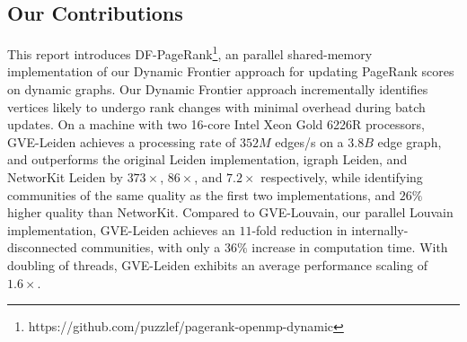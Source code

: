 \subsection{Our Contributions}

This report introduces DF-PageRank\footnote{https://github.com/puzzlef/pagerank-openmp-dynamic}, an parallel shared-memory implementation of our Dynamic Frontier approach for updating PageRank scores on dynamic graphs. Our Dynamic Frontier approach incrementally identifies vertices likely to undergo rank changes with minimal overhead during batch updates. On a machine with two 16-core Intel Xeon Gold 6226R processors, GVE-Leiden achieves a processing rate of $352 M$ edges/s on a $3.8 B$ edge graph, and outperforms the original Leiden implementation, igraph Leiden, and NetworKit Leiden by $373\times$, $86\times$, and $7.2\times$ respectively, while identifying communities of the same quality as the first two implementations, and $26\%$ higher quality than NetworKit. Compared to GVE-Louvain, our parallel Louvain implementation, GVE-Leiden achieves an $11$-fold reduction in internally-disconnected communities, with only a $36\%$ increase in computation time. With doubling of threads, GVE-Leiden exhibits an average performance scaling of $1.6\times$.







